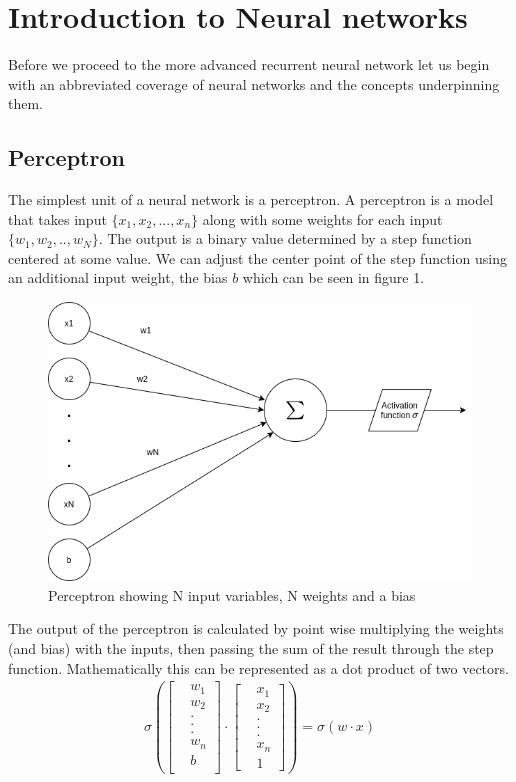 \documentclass{article}
\begin{document}
\section{Introduction to Neural networks}
\label{sec:intro}
Before we proceed to the more advanced recurrent neural network let us begin with an abbreviated coverage of neural networks and the concepts underpinning them. 
\subsection{Perceptron}
\label{sec:peceptrons}
The simplest unit of a neural network is a perceptron. A perceptron is a model that takes input $\{x_1, x_2, ... ,x_n\}$ along with some weights for each input $\{w_1, w_2, .., w_N\}$. The output is a binary value determined by a step function centered at some value. \cite{Nielsen} We can adjust the center point of the step function using an additional input weight, the bias $b$ which can be seen in figure 1.
\begin{figure}[H]
\centering
\caption{Perceptron showing N input variables, N weights and a bias}
\includegraphics[scale=0.5]{peceptron.png}
\end{figure}
The output of the perceptron is calculated by point wise multiplying the weights (and bias) with the inputs, then passing the sum of the result through the step function. Mathematically this can be represented as a dot product of two vectors. 
\begin{align*}
\sigma \left(\begin{bmatrix}
&w_1 \\
&w_2 \\
&. \\
&. \\
&. \\
&w_n \\
&b \\
\end{bmatrix} 
\cdot 
\begin{bmatrix}
&x_1 \\
&x_2 \\
&. \\
&. \\
&. \\
&x_n \\
&1
\end{bmatrix}\right) = \sigma \left(w\cdot x\right)
\end{align*}
\end{document}
